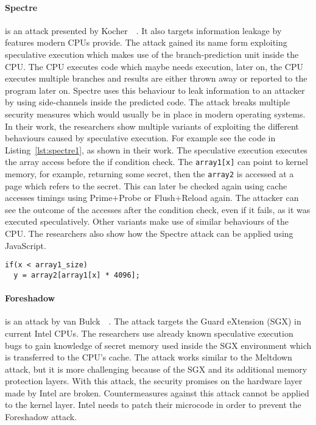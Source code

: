 \paragraph{Spectre} is an attack presented by Kocher~\etal~\cite{spectre}. It
also targets information leakage by features modern CPUs provide. The attack
gained its name form exploiting speculative execution which makes use of the
branch-prediction unit inside the CPU. The CPU executes code which maybe needs
execution, later on, the CPU executes multiple branches and results are either
thrown away or reported to the program later on. Spectre uses this behaviour to
leak information to an attacker by using side-channels inside the predicted
code. The attack breaks multiple security measures which would usually be in
place in modern operating systems. In their work, the researchers show multiple
variants of exploiting the different behaviours caused by speculative execution.
For example see the code in Listing~\ref{lst:spectre1}, as shown in their work.
The speculative execution executes the array access before the if condition
check. The \texttt{array1[x]} can point to kernel memory, for example, returning
some secret, then the \texttt{array2} is accessed at a page which refers to the
secret. This can later be checked again using cache accesses timings using
Prime+Probe or Flush+Reload again. The attacker can see the outcome of the
accesses after the condition check, even if it fails, as it was executed
speculatively. Other variants make use of similar behaviours of the CPU. The
researchers also show how the Spectre attack can be applied using JavaScript.

\begin{minipage}{\linewidth}
\begin{lstlisting}[style=CStyle,
                   caption={Code for Spectre variant one, showing a
conditional branch example, as seen by the work done by
Kocher~\etal~\cite{spectre}.},
                   label={lst:spectre1}]
if(x < array1_size)
  y = array2[array1[x] * 4096];
\end{lstlisting}
\end{minipage}

\paragraph{Foreshadow} is an attack by van Bulck~\etal~\cite{foreshadow}.  The
attack targets the Guard eXtension (SGX) in current Intel CPUs. The researchers
use already known speculative execution bugs to gain knowledge of secret memory
used inside the SGX environment which is transferred to the CPU's cache. The
attack works similar to the Meltdown attack, but it is more challenging because
of the SGX and its additional memory protection layers. With this attack, the
security promises on the hardware layer made by Intel are broken.
Countermeasures against this attack cannot be applied to the kernel layer. Intel
needs to patch their microcode in order to prevent the Foreshadow attack.

